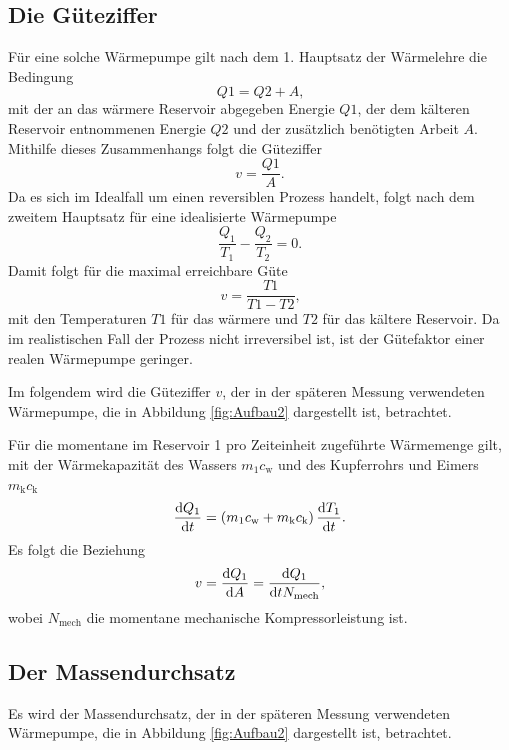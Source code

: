 \subsection{Die Güteziffer}
Für eine solche Wärmepumpe gilt nach dem 1. Hauptsatz der Wärmelehre die Bedingung
\begin{equation}
Q1 = Q2 + A\label{eq:Q1}\text{,}
\end{equation}
mit der an das wärmere Reservoir abgegeben Energie $Q1$, der dem kälteren
Reservoir entnommenen Energie $Q2$ und der zusätzlich benötigten Arbeit $A$.
Mithilfe dieses Zusammenhangs folgt die Güteziffer
\begin{equation}
v = \frac{Q1}{A}\label{eq:v1}\text{.}
\end{equation}
Da es sich im Idealfall um einen reversiblen Prozess handelt, folgt nach dem zweitem Hauptsatz für eine idealisierte Wärmepumpe
\begin{equation}
\frac{Q_1}{T_1}-\frac{Q_2}{T_2}=0\label{eq:redQ}\text{.}
\end{equation}
Damit folgt für die maximal erreichbare Güte
\begin{equation}
v = \frac{T1}{T1-T2}\label{eq:vid}\text{,}
\end{equation}
mit den Temperaturen $T1$ für das wärmere und $T2$ für das kältere Reservoir.
Da im realistischen Fall der Prozess nicht irreversibel ist, ist der Gütefaktor einer realen Wärmepumpe geringer.


Im folgendem wird die Güteziffer $v$, der in der späteren Messung verwendeten Wärmepumpe, die in Abbildung \ref{fig:Aufbau2} dargestellt ist, betrachtet. 


Für die momentane im Reservoir 1 pro Zeiteinheit zugeführte Wärmemenge gilt, mit der Wärmekapazität des Wassers $m_1c_\text{w}$ und des Kupferrohrs und Eimers $m_\text{k}c_\text{k}$
\begin{equation}
  \frac{\mathop{}\!\mathrm{d} Q_1}{\mathop{}\!\mathrm{d} t} = \left( m_1c_\text{w} + m_\text{k}c_\text{k}\right) \frac{\mathop{}\!\mathrm{d} T_1}{\mathop{}\!\mathrm{d} t}\text{.}\label{eq:T1Q1}
\end{equation}
Es folgt die Beziehung
\begin{equation}
	v = \frac{\mathop{}\!\mathrm{d} Q_1}{\mathop{}\!\mathrm{d} A} = \frac{\mathop{}\!\mathrm{d} Q_1}{\mathop{}\!\mathrm{d} t N_\text{mech}}\text{,}\label{eq:v}
\end{equation}
wobei $N_\text{mech}$ die momentane mechanische Kompressorleistung ist.

\subsection{Der Massendurchsatz}
Es wird der Massendurchsatz, der in der späteren Messung verwendeten Wärmepumpe, die in Abbildung \ref{fig:Aufbau2} dargestellt ist, betrachtet.


